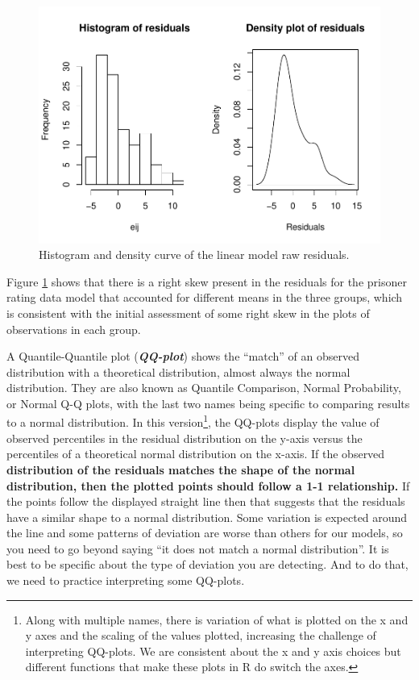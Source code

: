 \documentclass[]{book}
\let\rmarkdownfootnote\footnote%
\def\footnote{\protect\rmarkdownfootnote}
\begin{document}
\begin{figure}
\centering
\includegraphics{GreenwoodBanner_files/figure-latex/Figure3-10-1.pdf}
\caption{\label{fig:Figure3-10}Histogram and density curve of the linear model raw
residuals.}
\end{figure}

Figure \ref{fig:Figure3-10} shows that there is a right skew present in
the residuals for the prisoner rating data model that accounted for
different means in the three groups, which is consistent with the
initial assessment of some right skew in the plots of observations in
each group.

A Quantile-Quantile plot (\textbf{\emph{QQ-plot}}) shows the ``match''
of an observed distribution with a theoretical distribution, almost
always the normal distribution. They are also known as Quantile
Comparison, Normal Probability, or Normal Q-Q plots, with the last two
names being specific to comparing results to a normal distribution. In
this version\footnote{Along with multiple names, there is variation of
  what is plotted on the x and y axes and the scaling of the values
  plotted, increasing the challenge of interpreting QQ-plots. We are
  consistent about the x and y axis choices but different functions that
  make these plots in R do switch the axes.}, the QQ-plots display the
value of observed percentiles in the residual distribution on the y-axis
versus the percentiles of a theoretical normal distribution on the
x-axis. If the observed \textbf{distribution of the residuals matches
the shape of the normal distribution, then the plotted points should
follow a 1-1 relationship.} If the points follow the displayed straight
line then that suggests that the residuals have a similar shape to a
normal distribution. Some variation is expected around the line and some
patterns of deviation are worse than others for our models, so you need
to go beyond saying ``it does not match a normal distribution''. It is
best to be specific about the type of deviation you are detecting. And
to do that, we need to practice interpreting some QQ-plots.
\end{document}
